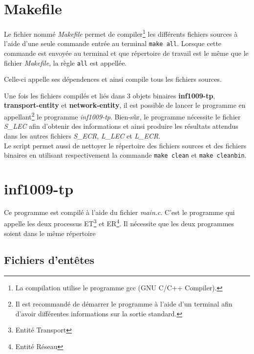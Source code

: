 \documentclass[11pt,french]{article}
\begin{document}
    \lstset{language=make}
    \section{Makefile} %
    \label{sec:makefile}
        Le fichier nommé \emph{Makefile} permet de compiler\footnote{La compilation utilise le programme
        gcc (GNU C/C++ Compiler).} les différents fichiers sources
        à l'aide d'une seule commande entrée au terminal \texttt{make all}. Lorsque cette commande
        est envoyée au terminal et que répertoire de travail est le même que le fichier \emph{Makefile},
        la règle \texttt{all} est appellée.
        
        Celle-ci appelle ses dépendences et ainsi compile tous les 
        fichiers sources.
        

        Une fois les fichiers compilés et liés dans 3 objets binaires
        {\bf inf1009-tp}, {\bf transport-entity} et {\bf network-entity},
        il est possible de lancer le programme en appellant\footnote{Il est recommandé de
        démarrer le programme à l'aide d'un terminal afin d'avoir différentes informations sur
        la sortie standard.} le programme \emph{inf1009-tp}.
        Bien-sûr, le programme nécessite le fichier \emph{S\_LEC} afin d'obtenir des informations et
        ainsi produire les résultats attendus dans les autres fichiers \emph{S\_ECR}, \emph{L\_LEC}
        et \emph{L\_ECR}.\\

        Le script permet aussi de nettoyer le répertoire des fichiers sources et des fichiers binaires
        en utilisant respectivement la commande \texttt{make clean} et \texttt{make cleanbin}.
        
    
    \lstset{language=c}
    
    \section{inf1009-tp} %
    \label{sec:inf1009-tp}
        Ce programme est compilé à l'aide du fichier \emph{main.c}. C'est le programme qui appelle
        les deux processus ET\footnote{Entité Transport} et ER\footnote{Entité Réseau}. Il nécessite
        que les deux programmes soient dans le même répertoire
        
        \subsection{Fichiers d'entêtes} %
        \label{sub:fich-entete}
            
\end{document}
